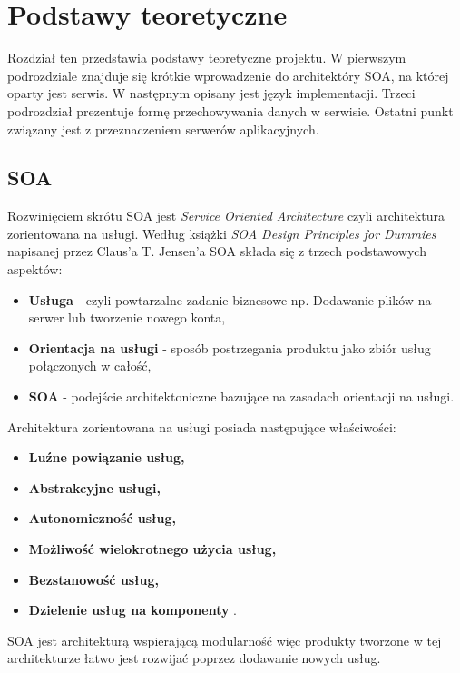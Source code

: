 \chapter{Podstawy teoretyczne}
\label{cha:podstawyTeoretyczne}
Rozdział ten przedstawia podstawy teoretyczne projektu. W pierwszym podrozdziale znajduje się krótkie wprowadzenie do architektóry SOA, na której oparty jest serwis. W następnym opisany jest język implementacji. Trzeci podrozdział prezentuje formę przechowywania danych w serwisie. Ostatni punkt związany jest z przeznaczeniem serwerów aplikacyjnych.


\section{SOA}
\label{sec:soa}

Rozwinięciem skrótu SOA jest \textit{Service Oriented Architecture} czyli architektura zorientowana na usługi. Według książki \textit{SOA Design Principles for Dummies} napisanej przez Claus'a T. Jensen'a SOA składa się z trzech podstawowych aspektów:
\begin{itemize}
	\item \textbf{Usługa} - czyli powtarzalne zadanie biznesowe np. Dodawanie plików na serwer lub tworzenie nowego konta,
	\item \textbf{Orientacja na usługi} - sposób postrzegania produktu jako zbiór usług połączonych w całość,
	\item \textbf{SOA} - podejście architektoniczne bazujące na zasadach orientacji na usługi.
\end{itemize}
Architektura zorientowana na usługi posiada następujące właściwości:
\begin{itemize}
	\item \textbf{Luźne powiązanie usług,}
	\item \textbf{Abstrakcyjne usługi,}
	\item \textbf{Autonomiczność usług,}
	\item \textbf{Możliwość wielokrotnego użycia usług,}
	\item \textbf{Bezstanowość usług,}
	\item \textbf{Dzielenie usług na komponenty} \cite{SOA13}.
\end{itemize}
SOA jest architekturą wspierającą modularność więc produkty tworzone w tej architekturze łatwo jest rozwijać poprzez dodawanie nowych usług. \newline

